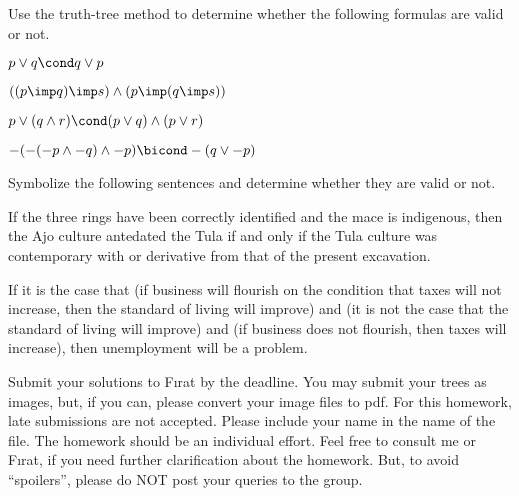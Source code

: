 \documentclass[a4paper]{exam}
\begin{document}
\begin{questions}

\question[50] Use the truth-tree method to determine whether the following formulas are valid or not.

\begin{parts}
\item $p\lor q \cond q\lor p$
\item $((p\imp q) \imp s)\land (p\imp (q\imp s))$
\item $p\lor (q\land r) \cond (p\lor q) \land (p \lor r)$
\item $-(-(-p\land -q)\land -p)\bicond -(q\lor -p)$
\end{parts}


\question[50] Symbolize the following sentences and determine whether they are valid or not. 

\begin{parts}
\item If the three rings have been correctly identified and the mace is indigenous, then the Ajo culture antedated the Tula if and only if the Tula culture was contemporary with or derivative from that of the present excavation. 

\item If it is the case that (if business will flourish on the condition that taxes will not increase, then the standard of living will improve) and (it is not the case that the standard of living will improve) and  (if business does not flourish, then taxes will increase), then unemployment will be a problem.

\end{parts}

\end{questions}

\noindent Submit your solutions to F{\i}rat by the deadline. You may submit your trees as images, but, if you can, please convert your image files to pdf. For this homework, late submissions are not accepted. Please include your name in the name of the file. The homework should be an individual effort. Feel free to consult me or F{\i}rat, if you need further clarification about the homework. But, to avoid ``spoilers'', please do NOT post your queries to the group.
\end{document}
